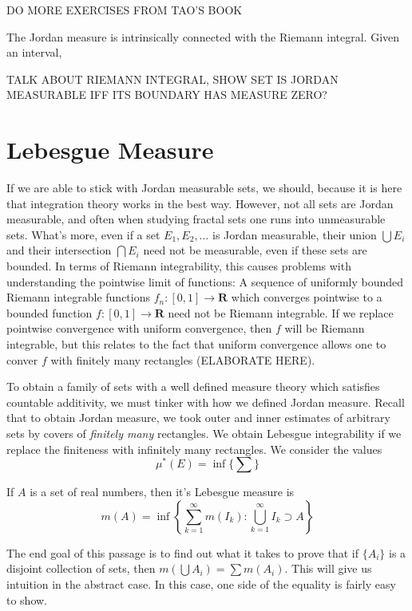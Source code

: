 DO MORE EXERCISES FROM TAO'S BOOK

The Jordan measure is intrinsically connected with the Riemann integral. Given an interval,

TALK ABOUT RIEMANN INTEGRAL, SHOW SET IS JORDAN MEASURABLE IFF ITS BOUNDARY HAS MEASURE ZERO?

\section{Lebesgue Measure}

If we are able to stick with Jordan measurable sets, we should, because it is here that integration theory works in the best way. However, not all sets are Jordan measurable, and often when studying fractal sets one runs into unmeasurable sets. What's more, even if a set $E_1, E_2, \dots$ is Jordan measurable, their union $\bigcup E_i$ and their intersection $\bigcap E_i$ need not be measurable, even if these sets are bounded. In terms of Riemann integrability, this causes problems with understanding the pointwise limit of functions: A sequence of uniformly bounded Riemann integrable functions $f_n: [0,1] \to \mathbf{R}$ which converges pointwise to a bounded function $f: [0,1] \to \mathbf{R}$ need not be Riemann integrable. If we replace pointwise convergence with uniform convergence, then $f$ will be Riemann integrable, but this relates to the fact that uniform convergence allows one to conver $f$ with finitely many rectangles (ELABORATE HERE).

To obtain a family of sets with a well defined measure theory which satisfies countable additivity, we must tinker with how we defined Jordan measure. Recall that to obtain Jordan measure, we took outer and inner estimates of arbitrary sets by covers of {\it finitely many} rectangles. We obtain Lebesgue integrability if we replace the finiteness with infinitely many rectangles. We consider the values
%
\[ \mu^*(E) = \inf \{ \sum \} \]

%
\begin{definition}
    If $A$ is a set of real numbers, then it's Lebesgue measure is
    \[ m(A) = \inf \left \{ \sum_{k = 1}^\infty m(I_k) : \bigcup_{k = 1}^\infty I_k \supset A \right \} \]
\end{definition}

The end goal of this passage is to find out what it takes to prove that if $\{A_i\}$ is a disjoint collection of sets, then $m(\bigcup A_i) = \sum m(A_i)$. This will give us intuition in the abstract case. In this case, one side of the equality is fairly easy to show.

